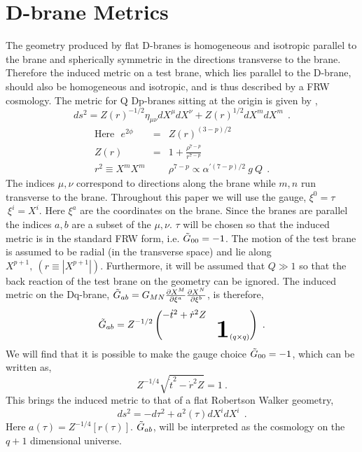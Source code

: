 \documentclass[a4paper,12pt]{article}
\newcommand{\gtab}{\Tilde{G}_{a b}}
\newcommand{\gt}{\Tilde{G}}
\newcommand{\rd}{\dot{r}}
\newcommand{\rds}{\dot{r}^2}
\newcommand{\tds}{\dot{t}^2}
\begin{document}
%
%
%
\section{D-brane Metrics}
%
%
%
The geometry produced by flat D-branes is homogeneous and isotropic parallel
to the brane and spherically symmetric in the directions transverse to
the brane.  Therefore the induced metric on a test brane, which lies
parallel to the D-brane, should also be homogeneous and isotropic, and
is thus described by a FRW cosmology.                          
The metric for Q Dp-branes sitting at the origin is given by \cite{jbbs},
$$
ds^2 = Z(r)^{-1/2} \eta_{\mu \nu} dX^\mu dX^\nu +  Z(r)^{1/2} dX^mdX^m \ \ .
$$
\begin{eqnarray*}
\mbox{Here} \ \ \ e^{2 \phi}   &=&   Z(r)^{(3-p)/2} \\ 
                 Z(r)   &=&   1 +\frac{\rho^{7-p}}{r^{7-p}} \\
     r^2 \equiv X^m X^m & & 
          \rho^{7-p}  \propto \alpha^{\prime (7-p)/2} \ g \ Q \ \ .
\end{eqnarray*}
The indices  $\mu, \nu$ correspond to directions along the brane
while $m, n$ run transverse to the brane.  Throughout this paper
we will use the gauge, 
$\xi^0 = \tau \ $  $\ \xi^i = X^i$.
Here $\xi^a$ are the coordinates on the brane.  Since the branes are
parallel the indices $a,b$ are a subset of the $\mu, \nu$.  $\tau$ will
be chosen so that the
induced metric is in the standard FRW form, i.e. $\gt_{0 0} = -1$.
The motion of the test brane is assumed to be radial (in the transverse
space) and lie along $X^{p+1}, \ (r \equiv |X^{p+1}|)$.  Furthermore,
it will be assumed that $Q \gg 1$ so that the back reaction of the test
brane on the geometry can be ignored.  
The induced metric on the Dq-brane, $\gtab = G_{M N} 
\frac{\partial X^M}{\partial \xi^a}
\frac{\partial X^N}{\partial \xi^b}$, is therefore,
$$
\gtab = Z^{-1/2}
\begin{pmatrix}
-\tds + \rd^2 Z &                                              \\
                 & \mbox{\Huge $\mathbf{1}$\normalsize$_{(q \times q)}$} 
\end{pmatrix} \ .
$$
We will find that it is possible to make the gauge choice 
$\gt_{0 0} = -1$, which can be written as,
\begin{equation}
Z^{-1/4} \sqrt{\tds - \rds Z} = 1 \ .
\label{goo}
\end{equation}
This brings the induced metric to that of a flat Robertson Walker geometry,
$$ ds^2 = - d\tau^2 + a^2(\tau)dX^idX^i \ \ .$$
Here $a(\tau) = Z^{-1/4}[r(\tau)]$.
$\gtab$, will be interpreted as the cosmology on
the $q+1$ dimensional universe.
  
\end{document}
